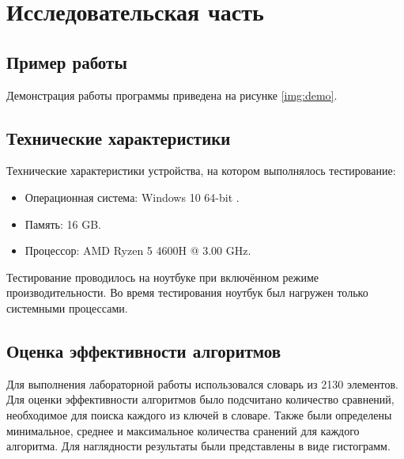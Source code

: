 \chapter{Исследовательская часть}

\section{Пример работы}

Демонстрация работы программы приведена на рисунке \ref{img:demo}.


\section{Технические характеристики}

Технические характеристики устройства, на котором выполнялось тестирование:

\begin{itemize}
	\item Операционная система: Windows 10 64-bit \cite{windows}.
	\item Память: 16 GB.
	\item Процессор: AMD Ryzen 5 4600H \cite{amd} @ 3.00 GHz.
\end{itemize}

Тестирование проводилось на ноутбуке при включённом режиме производительности. Во время тестирования ноутбук был нагружен только системными процессами.



\section{Оценка эффективности алгоритмов}
Для выполнения лабораторной работы использовался словарь из 2130 элементов. Для оценки эффективности алгоритмов было подсчитано количество сравнений, необходимое для поиска каждого из ключей в словаре. Также были определены минимальное, среднее и максимальное количества сранений для каждого алгоритма. Для наглядности результаты были представлены в виде гистограмм.

\clearpage


\clearpage

